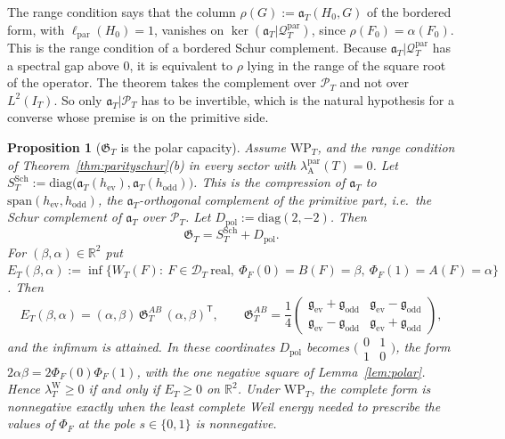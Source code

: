 \documentclass[11pt]{amsart}
\newtheorem{proposition}[theorem]{Proposition}
\theoremstyle{definition}
\theoremstyle{remark}
\newcommand{\R}{\mathbb R}
\newcommand{\PT}{\mathcal P_T}
\newcommand{\IT}{I_T}
\newcommand{\lamW}{\lambda^{\mathrm W}_T}
\begin{document}
The range condition says that the column $\rho(G):=\mathfrak a_T(H_0,G)$ of the bordered form, with
$\ell_{\mathrm{par}}(H_0)=1$, vanishes on $\ker(\mathfrak a_T|\mathcal Q^{\mathrm{par}}_T)$, since $\rho(F_0)=\alpha(F_0)$. This is the
range condition of a bordered Schur complement. Because $\mathfrak a_T|\mathcal Q^{\mathrm{par}}_T$ has a spectral gap above
$0$, it is equivalent to $\rho$ lying in the range of the square root of the operator. The theorem takes
the complement over $\PT$ and not over $L^2(\IT)$. So only $\mathfrak a_T|\PT$ has to be invertible, which is
the natural hypothesis for a converse whose premise is on the primitive side.

\begin{proposition}[$\mathfrak G_T$ is the polar capacity]\label{prop:polarcap}
Assume $\mathrm{WP}_T$, and the range condition of Theorem~\ref{thm:parityschur}(b) in every
sector with $\lambda^{\mathrm{par}}_{\mathrm A}(T)=0$. Let
$S^{\mathrm{Sch}}_T:=\mathrm{diag}\big(\mathfrak a_T(h_{\mathrm{ev}}),\mathfrak a_T(h_{\mathrm{odd}})\big)$. This is the compression of
$\mathfrak a_T$ to $\mathrm{span}(h_{\mathrm{ev}},h_{\mathrm{odd}})$, the $\mathfrak a_T$-orthogonal complement of the primitive part,
i.e.\ the Schur complement of $\mathfrak a_T$ over $\PT$. Let $D_{\mathrm{pol}}:=\mathrm{diag}(2,-2)$. Then
\[
\mathfrak G_T=S^{\mathrm{Sch}}_T+D_{\mathrm{pol}} .
\]
For $(\beta,\alpha)\in\R^2$ put
$E_T(\beta,\alpha):=\inf\{W_T(F):\ F\in\mathcal D_T\ \text{real},\ \Phi_F(0)=B(F)=\beta,\ \Phi_F(1)=A(F)=\alpha\}$. Then
\[
E_T(\beta,\alpha)=(\alpha,\beta)\,\mathfrak G^{AB}_T\,(\alpha,\beta)^{\mathsf T},\qquad
\mathfrak G^{AB}_T=\frac14\begin{pmatrix}\mathfrak g_{\mathrm{ev}}+\mathfrak g_{\mathrm{odd}}&\mathfrak g_{\mathrm{ev}}-\mathfrak g_{\mathrm{odd}}\\
\mathfrak g_{\mathrm{ev}}-\mathfrak g_{\mathrm{odd}}&\mathfrak g_{\mathrm{ev}}+\mathfrak g_{\mathrm{odd}}\end{pmatrix},
\]
and the infimum is attained. In these coordinates $D_{\mathrm{pol}}$ becomes $\big(\begin{smallmatrix}0&1\\1&0\end{smallmatrix}\big)$,
the form $2\alpha\beta=2\Phi_F(0)\Phi_F(1)$, with the one negative square of Lemma~\ref{lem:polar}. Hence
$\lamW\ge0$ if and only if $E_T\ge0$ on $\R^2$. Under $\mathrm{WP}_T$, the complete form is nonnegative
exactly when the least complete Weil energy needed to prescribe the values of $\Phi_F$ at the pole
$s\in\{0,1\}$ is nonnegative.
\end{proposition}
\end{document}
